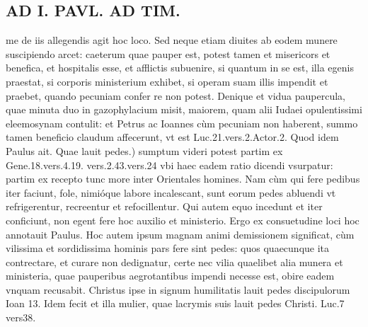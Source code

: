 \documentclass{article}
\begin{document}
\begin{pages}
\section*{AD I. PAVL. AD TIM. }
\marginpar{[ p.A0O ]}\pstart me de iis allegendis agit hoc loco. Sed neque etiam diuites ab eodem munere suscipiendo arcet: caeterum quae pauper est, potest tamen et misericors et benefica, et hospitalis esse, et afflictis subuenire, si quantum in se est, illa egenis praestat, si corporis ministerium exhibet, si operam suam illis impendit et praebet, quando pecuniam confer re non potest. Denique et vidua paupercula, quae minuta duo in gazophylacium misit, maiorem, quam alii Iudaei opulentissimi eleemosynam contulit: et Petrus ac Ioannes cùm pecuniam non haberent, summo tamen beneficio claudum affecerunt, vt est Luc.21.vers.2.Actor.2.  \pend\pstart Quod idem Paulus ait. Quae lauit pedes.) sumptum videri potest partim ex Gene.18.vers.4.19. vers.2.43.vers.24 vbi haec eadem ratio dicendi vsurpatur: partim ex recepto tunc more inter Orientales homines. Nam cùm qui fere pedibus iter faciunt, fole, nimióque labore incalescant, sunt eorum pedes abluendi vt refrigerentur, recreentur et refocillentur. Qui autem equo incedunt et iter conficiunt, non egent fere hoc auxilio et ministerio. Ergo ex consuetudine loci hoc annotauit Paulus. Hoc autem ipsum magnam animi demissionem significat, cùm vilissima et sordidissima hominis pars fere sint pedes: quos quaecunque ita contrectare, et curare non dedignatur, certe nec vilia quaelibet alia munera et ministeria, quae pauperibus aegrotantibus impendi necesse est, obire eadem vnquam recusabit. Christus ipse in signum humilitatis lauit pedes discipulorum Ioan 13. Idem fecit et illa mulier, quae lacrymis suis lauit pedes Christi. Luc.7 vers38.  \pend

\end{pages}
\end{document}
